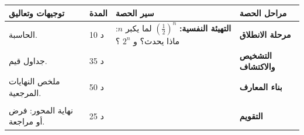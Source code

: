 \documentclass[12pt,a4paper]{article}
\newenvironment{LTR}{\begin{otherlanguage}{english}}{\end{otherlanguage}}
\newcommand{\ar}[1]{\foreignlanguage{arabic}{#1}}
\renewcommand{\cdots}{\mathinner{\cdotp\cdotp\cdotp}}
\newcommand{\Phase}[1]{\textbf{#1}}
\newenvironment{Sayr}{%
\begin{LTR}\renewcommand{\arraystretch}{1.25}
\begin{longtable}{|p{0.17\textwidth}|>{\centering\arraybackslash}p{0.06\textwidth}|p{0.53\textwidth}|>{\centering\arraybackslash}p{0.12\textwidth}|}
\hline\rowcolor{cThm!12}\ar{\textbf{توجيهات وتعاليق}} & \ar{\textbf{المدة}} & \ar{\textbf{سير الحصة}} & \ar{\textbf{مراحل الحصة}}\\\hline\endhead
\hline\endfoot}{\end{longtable}\end{LTR}}
\newcommand{\Row}[4]{\ar{\small #4} & \ar{#3} & \ar{#2} & \cellcolor{cThm!8}\ar{\Phase{#1}}\\\hline}
\newcommand{\Lab}[2]{\foreignlanguage{english}{\tcbox[on line,colback=#1,colframe=#1,boxrule=0pt,arc=2pt,boxsep=1pt,left=5pt,right=5pt,top=1pt,bottom=1pt]{\ar{\textcolor{white}{\textbf{#2}}}}}}
\newcommand{\ck}{\ensuremath{{\color{cRem}\checkmark}}}
\begin{document}
\begin{Sayr}
\Row{مرحلة الانطلاق}{%
\textbf{التهيئة النفسية:} $\left(\frac12\right)^n$ لما يكبر $n$: ماذا يحدث؟ و $2^n$ ؟}{10 د}{الحاسبة.}
\Row{التشخيص والاكتشاف}{%
\Lab{cEx}{وضعية مقترحة}\par\ck\ جدول قيم بالحاسبة لـ $0{,}5^n$ و $2^n$ و $\dfrac{2n+1}{n+3}$.\par
\ck\ نلاحظ: الأولى تقترب من $0$ ، الثانية تكبر بلا حدود ، الثالثة تقترب من $2$.\par
}{35 د}{جداول قيم.}
\Row{بناء المعارف}{%
\Lab{cDef}{تعريف}\ $(u_n)$ \textbf{متقاربة} إذا كانت لها نهاية حقيقية $l$ لما $n\to+\infty$ ، وإلا فهي متباعدة.\par\Lab{cThm}{خاصية}\par\ck\ إذا كان $u_n=f(n)$ و $\lim\limits_{x\to+\infty}f(x)=l$ فإن $\lim u_n=l$.\par
\ck\ $q^n$: نهايتها $0$ إذا كان $-1<q<1$ ، و $+\infty$ إذا كان $q>1$.\par
\ck\ متتالية حسابية أساسها $r>0$ نهايتها $+\infty$.\par
}{50 د}{ملخص النهايات المرجعية.}
\Row{}{%
\Lab{cEx}{مثال}\par\ck\ $\lim\dfrac{2n+1}{n+3}=2$: متقاربة.\par
\ck\ $S_n=1+\frac12+\cdots+\left(\frac12\right)^n=2\left(1-\left(\frac12\right)^{n+1}\right)$ ، $\lim S_n=2$.\par
\Lab{cThm!80!black}{حذار}\ $\lim(-1)^n$ غير موجودة: المتتالية متباعدة رغم أنها لا تؤول إلى $\infty$.}{}{}
\Row{التقويم}{%
\Lab{cEx}{تطبيق}\par ادرس تقارب: $w_n=5-2\times0{,}8^n$ ؛ $t_n=n^2-3n$.\par\textbf{الحل:} $0{,}8^n\to0$: $w_n\to5$ ، متقاربة ؛ $t_n\to+\infty$: متباعدة.\par\textbf{واجب منزلي:} تمارين 51 ، 52 ، 71 ، 82 ، 87 من باب المتتاليات.\par\smallskip\textbf{ملاحظات حول سير الحصة:} \dotfill}{25 د}{نهاية المحور: فرض أو مراجعة.}
\end{Sayr}
\end{document}
